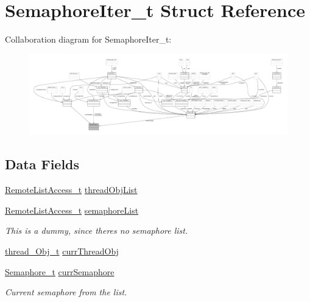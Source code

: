 \hypertarget{struct_semaphore_iter__t}{}\section{Semaphore\+Iter\+\_\+t Struct Reference}
\label{struct_semaphore_iter__t}


Collaboration diagram for Semaphore\+Iter\+\_\+t\+:
\nopagebreak
\begin{figure}[H]
\begin{center}
\leavevmode
\includegraphics[width=350pt]{struct_semaphore_iter__t__coll__graph}
\end{center}
\end{figure}
\subsection*{Data Fields}
\begin{DoxyCompactItemize}
\item 
\hyperlink{struct_remote_list_access__t}{Remote\+List\+Access\+\_\+t} \hyperlink{struct_semaphore_iter__t_abef86fb2e4dbf7733ef62d36abfc37de}{thread\+Obj\+List}
\item 
\hyperlink{struct_remote_list_access__t}{Remote\+List\+Access\+\_\+t} \hyperlink{struct_semaphore_iter__t_ad5a7b88965fe0a5ed781fc68000a167a}{semaphore\+List}
\begin{DoxyCompactList}\small\item\em This is a dummy, since there\textquotesingle{}s no semaphore list. \end{DoxyCompactList}\item 
\hyperlink{structthread___obj__t}{thread\+\_\+\+Obj\+\_\+t} \hyperlink{struct_semaphore_iter__t_a226cdb6fe4e10083edd12868b59021c0}{curr\+Thread\+Obj}
\item 
\hyperlink{struct_semaphore__t}{Semaphore\+\_\+t} \hyperlink{struct_semaphore_iter__t_adeb9575dac28e58772fa2e805c25aee6}{curr\+Semaphore}
\begin{DoxyCompactList}\small\item\em Current semaphore from the list. \end{DoxyCompactList}\end{DoxyCompactItemize}


